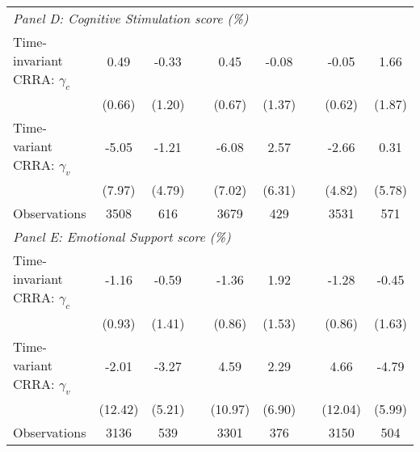 {\begin{tabular}{l*{8}{c}}
\midrule
\multicolumn{9}{l}{\textit{Panel D: Cognitive Stimulation score (\%)}} \\
Time-invariant CRRA: $\gamma_c$&     0.49     &    -0.33  &  & 0.45 & -0.08 &&   -0.05 &     1.66       \\
                &   (0.66) &   (1.20)&    &  (0.67) & (1.37) && (0.62) &   (1.87)       \\
\addlinespace
Time-variant CRRA: $\gamma_v$&    -5.05  &    -1.21    &    & -6.08 & 2.57 &&   -2.66 &     0.31         \\
         &   (7.97)&   (4.79)    &   & (7.02) & (6.31) &&  (4.82)  &   (5.78)         \\
\midrule
Observations    &     3508   &      616         &  & 3679 & 429 &&    3531    &      571  \\



\midrule
\multicolumn{9}{l}{\textit{Panel E: Emotional Support score (\%)}}  \\
Time-invariant CRRA: $\gamma_c$&    -1.16    &    -0.59  &    & -1.36 & 1.92 &&   -1.28    &    -0.45\\
                &   (0.93)    &   (1.41)     &    & (0.86) & (1.53) &&  (0.86)  &   (1.63) \\
\addlinespace
Time-variant CRRA: $\gamma_v$&   -2.01     &    -3.27     &   & 4.59 & 2.29 &&    4.66     &    -4.79         \\
    &  (12.42)     &     (5.21)     &    & (10.97) & (6.90) &&  (12.04)  &   (5.99)      \\
\midrule
Observations    &     3136    &      539   &    & 3301 & 376 &&     3150   &      504 \\
\bottomrule

\end{tabular}
}
